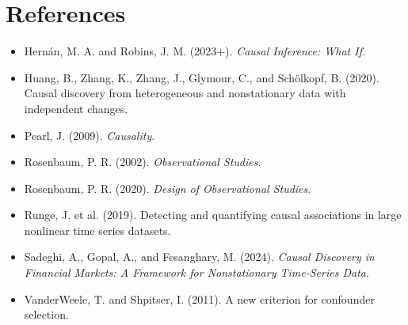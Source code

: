\documentclass[12pt]{article}
\begin{document}
\clearpage
\section*{References}

\footnotesize
\begin{itemize}[leftmargin=1.5em, itemsep=0pt, parsep=0pt, topsep=2pt]
\item Hern\'an, M. A. and Robins, J. M. (2023+). \textit{Causal Inference: What If}.
\item Huang, B., Zhang, K., Zhang, J., Glymour, C., and Sch\"olkopf, B. (2020). Causal discovery from heterogeneous and nonstationary data with independent changes.
\item Pearl, J. (2009). \textit{Causality}.
\item Rosenbaum, P. R. (2002). \textit{Observational Studies}.
\item Rosenbaum, P. R. (2020). \textit{Design of Observational Studies}.
\item Runge, J. et al. (2019). Detecting and quantifying causal associations in large nonlinear time series datasets.
\item Sadeghi, A., Gopal, A., and Fesanghary, M. (2024). \textit{Causal Discovery in Financial Markets: A Framework for Nonstationary Time-Series Data}.
\item VanderWeele, T. and Shpitser, I. (2011). A new criterion for confounder selection.
\end{itemize}
\end{document}
